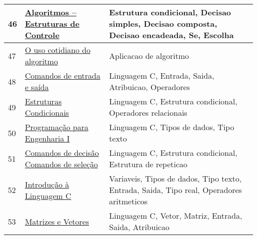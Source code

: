 \begin{longtable}{| p{} | p{} | p{} |}
46  & \href{http://www.din.uem.br/~teclopes/FCaula5.pdf}{Algoritmos – Estruturas de Controle                                                 } & Estrutura condicional, Decisao simples, Decisao composta, Decisao encadeada, Se, Escolha                                                          \\ \hline
47  & \href{http://www.gazetadopovo.com.br/vida-e-cidadania/o-uso-cotidiano-do-algoritmo-4x3n9sw4bkhoam6fzqcp27mfi}{O uso cotidiano do algoritmo                                                        } & Aplicacao de algoritmo                                                                                                                            \\ \hline
48  & \href{http://www.ic.unicamp.br/~sheila/mc102/02\_Entrada\%20Saida\%20e\%20Operadores.pdf}{Comandos de entrada e saída                                                         } & Linguagem C, Entrada, Saida, Atribuicao, Operadores                                                                                               \\ \hline
49  & \href{http://www.ic.unicamp.br/~wainer/cursos/2s2011/Cap05-EstruturasCondicionais-texto.pdf}{Estruturas Condicionais                                                             } & Linguagem C, Estrutura condicional, Operadores relacionais                                                                                        \\ \hline
50  & \href{http://www.inf.pucrs.br/~benso/progi/guia.htm}{Programação para Engenharia I                                                       } & Linguagem C, Tipos de dados, Tipo texto                                                                                                           \\ \hline
51  & \href{http://www.inf.pucrs.br/~pinho/LaproI/ComandosDeRepeticao/Repeticao.html}{Comandos de decisão Comandos de seleção                                             } & Linguagem C, Estrutura condicional, Estrutura de repeticao                                                                                        \\ \hline
52  & \href{http://www.inf.pucrs.br/~pinho/LaproI/IntroC/IntroC.htm}{Introdução à Linguagem C                                                            } & Variaveis, Tipos de dados, Tipo texto, Entrada, Saida, Tipo real, Operadores aritmeticos                                                          \\ \hline
53  & \href{http://www.inf.pucrs.br/~pinho/LaproI/Vetores/Vetores.htm}{Matrizes e Vetores                                                                  } & Linguagem C, Vetor, Matriz, Entrada, Saida, Atribuicao                                                                                            \\ \hline

\end{longtable}
